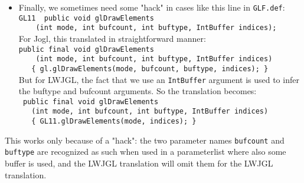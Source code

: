 \begin{itemize}
  \item Finally, we sometimes need some "hack" in cases like this line in \verb"GLF.def":\\
  \verb"GL11  public void glDrawElements"\\
  \verb"    (int mode, int bufcount, int buftype, IntBuffer indices);"\\
  For Jogl, this translated in straightforward manner:\\
  \verb"public final void glDrawElements"\\
  \verb"    (int mode, int bufcount, int buftype, IntBuffer indices)"\\
   \verb"   { gl.glDrawElements(mode, bufcount, buftype, indices); }"\\
   But for LWJGL, the fact that we use an \verb"IntBuffer" argument is used to infer the buftype and bufcount
   arguments. So the translation becomes:\\
   \verb" public final void glDrawElements"\\
   \verb"   (int mode, int bufcount, int buftype, IntBuffer indices) "\\
   \verb"   { GL11.glDrawElements(mode, indices); }"\\
  \end{itemize}
  
  This works only because of a "hack": the two parameter names \verb"bufcount" and \verb"buftype"
  are recognized as such when used in a parameterlist where also some buffer is used,
  and the LWJGL translation will omit them for the LWJGL translation. 